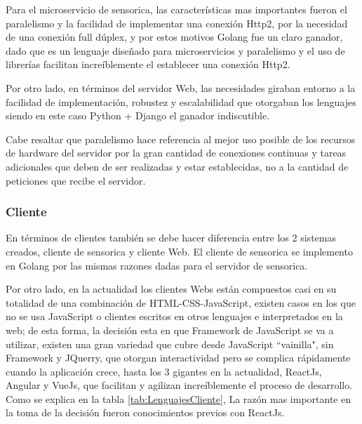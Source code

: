     Para el microservicio de sensorica, las características mas importantes fueron
    el paralelismo y la facilidad de implementar una conexión Http2, por la
    necesidad de una conexión full dúplex, y por estos motivos Golang fue un claro
    ganador, dado que es un lenguaje diseñado para microservicios y paralelismo y
    el uso de librerías facilitan increíblemente el establecer una conexión Http2.

    Por otro lado, en términos del servidor Web, las necesidades giraban entorno
    a la facilidad de implementación, robustez y escalabilidad que otorgaban los
    lenguajes siendo en este caso Python + Django el ganador indiscutible.


    Cabe resaltar que paralelismo hace referencia al mejor uso posible de los
    recursos de hardware del servidor por la gran cantidad de conexiones
    continuas y tareas adicionales que deben de ser realizadas y estar
    establecidas, no a la cantidad de peticiones que recibe el servidor.

    \subsubsection{Cliente}

    En términos de clientes también se debe hacer diferencia entre los 2 sistemas
    creados, cliente de sensorica y cliente Web. El cliente de sensorica se
    implemento en Golang por las mismas razones dadas para el servidor de sensorica.

    Por otro lado, en la actualidad los clientes Webs están compuestos casi en
    su totalidad de una combinación de HTML-CSS-JavaScript, existen casos en los
    que no se usa JavaScript o clientes escritos en otros lenguajes e interpretados
    en la web; de esta forma, la decisión esta en que Framework de JavaScript se
    va a utilizar, existen una gran variedad que cubre desde JavaScript ``vainilla",
    sin Framework y JQuerry, que otorgan interactividad pero se complica rápidamente
    cuando la aplicación crece, hasta los 3 gigantes en la actualidad, ReactJs,
    Angular y VueJs, que facilitan y agilizan increíblemente el proceso de desarrollo.
    Como se explica en la tabla \ref{tab:LenguajesCliente}, La razón mas importante
    en la toma de la decisión fueron conocimientos previos con ReactJs.



